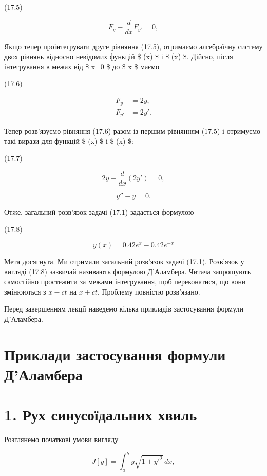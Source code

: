 \documentclass[
  ukrainian,
]{article}
\begin{document}
(17.5)

\[
F_y - \frac{d}{dx} F_{y'} = 0,
\]

Якщо тепер проінтегрувати друге рівняння (17.5), отримаємо алгебраїчну
систему двох рівнянь відносно невідомих функцій \$ \varphi(x) \$ і \$
\psi(x) \$. Дійсно, після інтегрування в межах від \$ x\_0 \$ до \$ x \$
маємо

(17.6)

\[
\begin{aligned}
F_y &= 2y, \\
F_{y'} &= 2y'.
\end{aligned}
\]

Тепер розв'язуємо рівняння (17.6) разом із першим рівнянням (17.5) і
отримуємо такі вирази для функцій \$ \varphi(x) \$ і \$ \psi(x) \$:

(17.7)

\[
2y - \frac{d}{dx}(2y') = 0,
\]

\[
y'' - y = 0.
\]

Отже, загальний розв'язок задачі (17.1) задається формулою

(17.8)

\[
\overline{y}(x) = 0.42e^x - 0.42e^{-x}
\]

Мета досягнута. Ми отримали загальний розв'язок задачі (17.1). Розв'язок
у вигляді (17.8) зазвичай називають формулою Д'Аламбера. Читача
запрошують самостійно простежити за межами інтегрування, щоб
переконатися, що вони змінюються з \(x-ct\) на \(x+ct\). Проблему
повністю розв'язано.

Перед завершенням лекції наведемо кілька прикладів застосування формули
Д'Аламбера.

\section{Приклади застосування формули
Д'Аламбера}\label{ux43fux440ux438ux43aux43bux430ux434ux438-ux437ux430ux441ux442ux43eux441ux443ux432ux430ux43dux43dux44f-ux444ux43eux440ux43cux443ux43bux438-ux434ux430ux43bux430ux43cux431ux435ux440ux430}

\section{1. Рух синусоїдальних
хвиль}\label{ux440ux443ux445-ux441ux438ux43dux443ux441ux43eux457ux434ux430ux43bux44cux43dux438ux445-ux445ux432ux438ux43bux44c}

Розглянемо початкові умови вигляду

\[
J[y] = \int_a^b y \sqrt{1 + y'^2} \, dx,
\]
\end{document}
